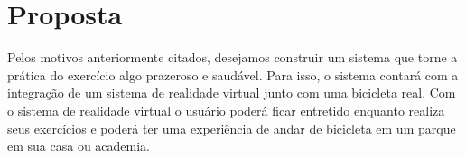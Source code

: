 \chapter*[Proposta]{Proposta}

Pelos motivos anteriormente citados, desejamos construir um sistema que torne a prática do exercício algo prazeroso e saudável. Para isso, o sistema contará com a integração de um sistema de realidade virtual junto com uma bicicleta real. Com o sistema de realidade virtual o usuário poderá ficar entretido enquanto realiza seus exercícios e poderá ter uma experiência de andar de bicicleta em um parque em sua casa ou academia.

